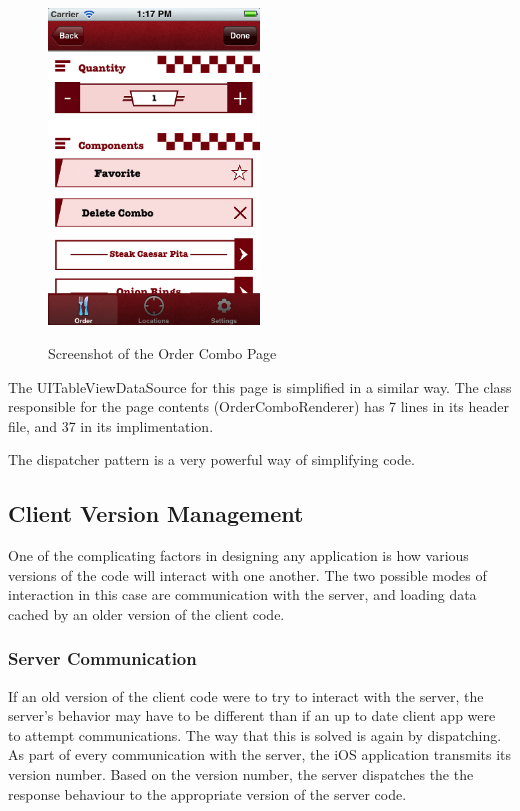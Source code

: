 \documentclass[se]{uw-wkrpt}
\begin{document}
\begin{figure}[h!]
  \caption{Screenshot of the Order Combo Page}
  \centering
    \includegraphics[width=0.5\textwidth]{orderComboPage}
  \label{fig:Combo Page}
\end{figure}

The UITableViewDataSource for this page is simplified in a similar way. The class responsible
for the page contents (OrderComboRenderer) has 7 lines in its header file, and 37 in its implimentation.


The dispatcher pattern is a very powerful way of simplifying code.

\subsection{Client Version Management}

One of the complicating factors in designing any application is how various versions of the code will
interact with one another. The two possible modes of interaction in this case are communication with
the server, and loading data cached by an older version of the client code. 

\subsubsection{Server Communication}

If an old version of the client code were to try to interact with the server, the server's behavior
may have to be different than if an up to date client app were to attempt communications. The way that
this is solved is again by dispatching. As part of every communication with the server, the iOS application
transmits its version number. Based on the version number, the server dispatches the the response behaviour
to the appropriate version of the server code.
\end{document}
